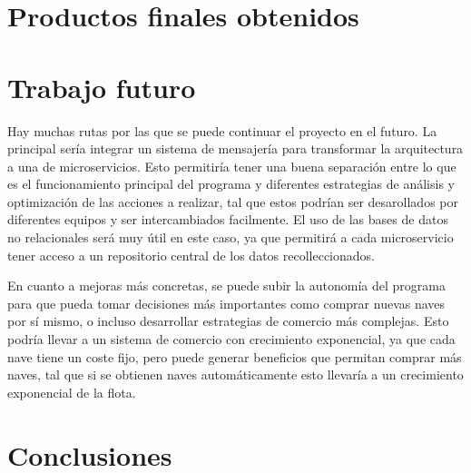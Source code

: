 \documentclass[spanish]{article}
\begin{document}
\section{Productos finales obtenidos}


\section{Trabajo futuro}

Hay muchas rutas por las que se puede continuar el proyecto en el futuro.
La principal sería integrar un sistema de mensajería para
transformar la arquitectura a una de microservicios.
Esto permitiría tener una buena separación entre lo que es
el funcionamiento principal del programa y diferentes estrategias
de análisis y optimización de las acciones a realizar, tal que estos podrían
ser desarollados por diferentes equipos y ser intercambiados facilmente.
El uso de las bases de datos no relacionales será muy útil en este caso,
ya que permitirá a cada microservicio tener acceso a un repositorio central
de los datos recolleccionados.

En cuanto a mejoras más concretas,
se puede subir la autonomía del programa para que pueda tomar decisiones
más importantes como comprar nuevas naves por sí mismo, o incluso
desarrollar estrategias de comercio más complejas.
Esto podría llevar a un sistema de comercio con crecimiento
exponencial, ya que cada nave tiene un coste fijo, pero
puede generar beneficios que permitan comprar más naves,
tal que si se obtienen naves automáticamente esto llevaría
a un crecimiento exponencial de la flota.

\section{Conclusiones}
\end{document}
